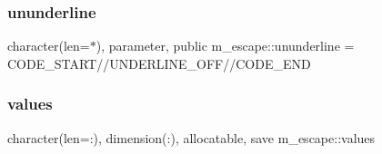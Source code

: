\mbox{\label{namespacem__escape_adbaa599772d5df6567d75188ac3258bf}} 
\subsubsection{\texorpdfstring{ununderline}{ununderline}}
{\footnotesize\ttfamily character(len=$\ast$), parameter, public m\+\_\+escape\+::ununderline = C\+O\+D\+E\+\_\+\+S\+T\+A\+RT//U\+N\+D\+E\+R\+L\+I\+N\+E\+\_\+\+O\+FF//C\+O\+D\+E\+\_\+\+E\+ND}

\mbox{\label{namespacem__escape_a4c3b430bde66148e6f2c79c5418384fa}} 
\subsubsection{\texorpdfstring{values}{values}}
{\footnotesize\ttfamily character(len=\+:), dimension(\+:), allocatable, save m\+\_\+escape\+::values\hspace{0.3cm}{\ttfamily [private]}}

